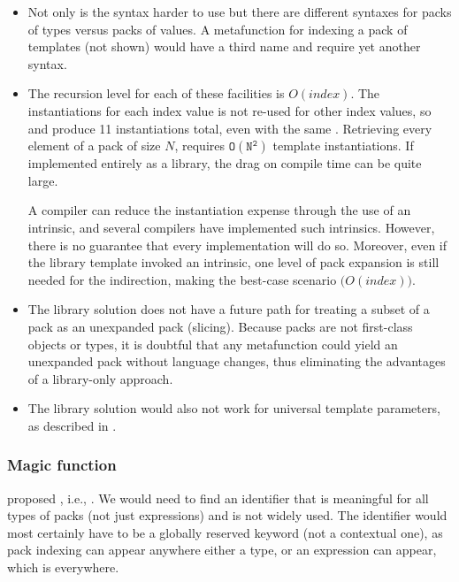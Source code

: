 \documentclass{wg21}
\begin{document}
\begin{itemize}
\item Not only is the syntax harder to use but there are different syntaxes
  for packs of types versus packs of values. A metafunction for indexing a pack
  of templates (not shown) would have a third name and require yet another
  syntax.
\item The recursion level for each of these facilities is
  $O(index)$. The instantiations for each index value is not re-used for
  other index values, so  and
   produce 11 instantiations total, even with the
  same .  Retrieving every element of a pack of size $N$,
  requires $\mathtt{O(N^2)}$ template instantiations.  If implemented entirely as
  a library, the drag on compile time can be quite large.

  A compiler can reduce the instantiation expense through the use of an
  intrinsic, and several compilers have implemented such intrinsics.  However,
  there is no guarantee that every implementation will do so.  Moreover, even
  if the library template invoked an intrinsic, one level of pack expansion is
  still needed for the indirection, making the best-case scenario
  $\mathtt(O(index))$.
\item The library solution does not have a future path for
  treating a subset of a pack as an unexpanded pack (slicing). Because packs
  are not first-class objects or types, it is doubtful that any metafunction
  could yield an unexpanded pack without language changes, thus eliminating the
  advantages of a library-only approach.
\item The library solution would also not work for universal template
  parameters, as described in .
\end{itemize}

\subsubsection{Magic function}

 proposed , i.e., .
We would need to find an identifier that is meaningful for all types of packs (not just expressions) and is not widely used.
The identifier would most certainly have to be a globally reserved keyword (not a contextual one), as pack indexing can appear anywhere either a type, or an expression can appear, which is everywhere.
\end{document}
